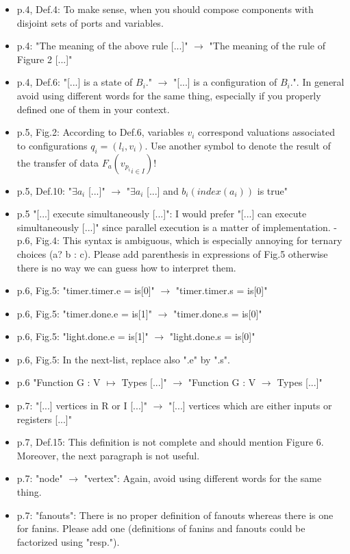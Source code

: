 \begin{itemize}
\item p.4, Def.4: To make sense, when you should compose components with disjoint 
sets of ports and variables.
\item p.4: "The meaning of the above rule [...]" $\rightarrow$ "The meaning of the rule of 
Figure 2 [...]"
\item p.4, Def.6: "[...] is a state of $B_i$." $\rightarrow$ "[...] is a configuration of 
$B_i$.". In general avoid using different words for the same thing, especially 
if you properly defined one of them in your context.
\item p.5, Fig.2: According to Def.6, variables $v_i$ correspond valuations 
associated to configurations $q_i = (l_i, v_i)$. Use another symbol to denote 
the result of the transfer of data $F_a({ v_{p_i} }_{i \in I})$!
\item p.5, Def.10: "$\exists a_i$ [...]" $\rightarrow$ "$\exists a_i$ [...] and $b_i(index(a_i))$ is 
true"
\item p.5 "[...] execute simultaneously [...]": I would prefer "[...] can execute 
simultaneously [...]" since parallel execution is a matter of implementation.
- p.6, Fig.4: This syntax is ambiguous, which is especially annoying for 
ternary choices (a? b : c). Please add parenthesis in expressions of Fig.5 
otherwise there is no way we can guess how to interpret them.
\item p.6, Fig.5: "timer.timer.e = is[0]" $\rightarrow$ "timer.timer.s = is[0]"
\item p.6, Fig.5: "timer.done.e = is[1]" $\rightarrow$ "timer.done.s = is[0]"
\item p.6, Fig.5: "light.done.e = is[1]" $\rightarrow$ "light.done.s = is[0]"
\item p.6, Fig.5: In the next-list, replace also ".e" by ".s".
\item p.6 "Function G : V $\mapsto$ Types [...]" $\rightarrow$ "Function G : V $\to$ Types 
[...]"
\item p.7: "[...] vertices in R or I [...]" $\rightarrow$ "[...] vertices which are either 
inputs or registers [...]"
\item p.7, Def.15: This definition is not complete and should mention Figure 6. 
Moreover, the next paragraph is not useful.
\item p.7: "node" $\rightarrow$ "vertex": Again, avoid using different words for the same 
thing.
\item p.7: "fanouts": There is no proper definition of fanouts whereas there is 
one for fanins. Please add one (definitions of fanins and fanouts could be 
factorized using "resp.").


\end{itemize}
